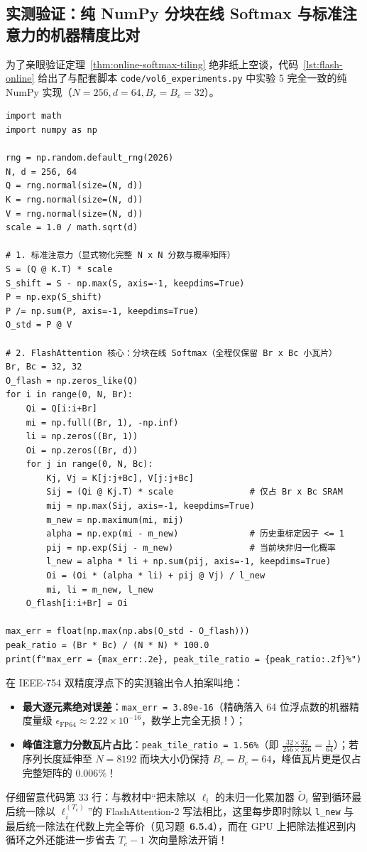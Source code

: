 \subsection{实测验证：纯 NumPy 分块在线 Softmax 与标准注意力的机器精度比对}

为了亲眼验证定理~\ref{thm:online-softmax-tiling} 绝非纸上空谈，代码~\ref{lst:flash-online} 给出了与配套脚本 \texttt{code/vol6\_experiments.py} 中实验 5 完全一致的纯 NumPy 实现（$N = 256, d = 64, B_r = B_c = 32$）。

\begin{lstlisting}[caption={纯 NumPy 实现 FlashAttention 在线 Softmax 分块递推并与标准注意力做精度核对。},label={lst:flash-online}]
import math
import numpy as np

rng = np.random.default_rng(2026)
N, d = 256, 64
Q = rng.normal(size=(N, d))
K = rng.normal(size=(N, d))
V = rng.normal(size=(N, d))
scale = 1.0 / math.sqrt(d)

# 1. 标准注意力（显式物化完整 N x N 分数与概率矩阵）
S = (Q @ K.T) * scale
S_shift = S - np.max(S, axis=-1, keepdims=True)
P = np.exp(S_shift)
P /= np.sum(P, axis=-1, keepdims=True)
O_std = P @ V

# 2. FlashAttention 核心：分块在线 Softmax（全程仅保留 Br x Bc 小瓦片）
Br, Bc = 32, 32
O_flash = np.zeros_like(Q)
for i in range(0, N, Br):
    Qi = Q[i:i+Br]
    mi = np.full((Br, 1), -np.inf)
    li = np.zeros((Br, 1))
    Oi = np.zeros((Br, d))
    for j in range(0, N, Bc):
        Kj, Vj = K[j:j+Bc], V[j:j+Bc]
        Sij = (Qi @ Kj.T) * scale               # 仅占 Br x Bc SRAM
        mij = np.max(Sij, axis=-1, keepdims=True)
        m_new = np.maximum(mi, mij)
        alpha = np.exp(mi - m_new)              # 历史重标定因子 <= 1
        pij = np.exp(Sij - m_new)               # 当前块非归一化概率
        l_new = alpha * li + np.sum(pij, axis=-1, keepdims=True)
        Oi = (Oi * (alpha * li) + pij @ Vj) / l_new
        mi, li = m_new, l_new
    O_flash[i:i+Br] = Oi

max_err = float(np.max(np.abs(O_std - O_flash)))
peak_ratio = (Br * Bc) / (N * N) * 100.0
print(f"max_err = {max_err:.2e}, peak_tile_ratio = {peak_ratio:.2f}%")
\end{lstlisting}

在 IEEE-754 双精度浮点下的实测输出令人拍案叫绝：
\begin{itemize}
  \item \textbf{最大逐元素绝对误差}：\texttt{max\_err = 3.89e-16}（精确落入 64 位浮点数的机器精度量级 $\epsilon_{\mathrm{FP64}} \approx 2.22\times 10^{-16}$，数学上完全无损！）；
  \item \textbf{峰值注意力分数瓦片占比}：\texttt{peak\_tile\_ratio = 1.56\%}（即 $\frac{32\times 32}{256\times 256} = \frac{1}{64}$）；若序列长度延伸至 $N = 8192$ 而块大小仍保持 $B_r = B_c = 64$，峰值瓦片更是仅占完整矩阵的 $\mathbf{0.006\%}$！
\end{itemize}
仔细留意代码第 33 行：与教材中“把未除以 $\ell_i$ 的未归一化累加器 $\tilde{O}_i$ 留到循环最后统一除以 $\ell_i^{(T_c)}$”的 FlashAttention-2 写法相比，这里每步即时除以 \texttt{l\_new} 与最后统一除法在代数上完全等价（见习题~\textbf{6.5.4}），而在 GPU 上把除法推迟到内循环之外还能进一步省去 $T_c - 1$ 次向量除法开销！


